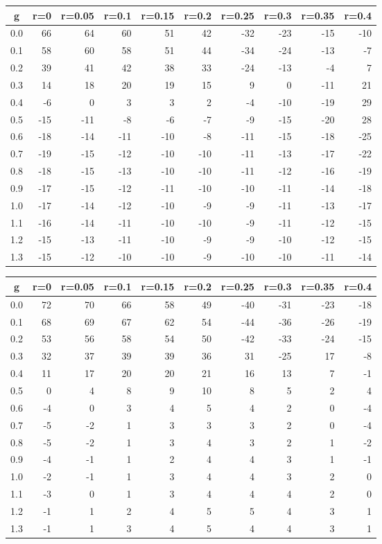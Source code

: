 %
\begin{table}[!tbp]
 \begin{center}
 \begin{tabular}{rrrrrrrrrr}\hline\hline
\multicolumn{1}{c}{g}&\multicolumn{1}{c}{r=0}&\multicolumn{1}{c}{r=0.05}&\multicolumn{1}{c}{r=0.1}&\multicolumn{1}{c}{r=0.15}&\multicolumn{1}{c}{r=0.2}&\multicolumn{1}{c}{r=0.25}&\multicolumn{1}{c}{r=0.3}&\multicolumn{1}{c}{r=0.35}&\multicolumn{1}{c}{r=0.4}\tabularnewline
\hline
0.0& 66& 64& 60& 51& 42&-32&-23&-15&-10\tabularnewline
0.1& 58& 60& 58& 51& 44&-34&-24&-13& -7\tabularnewline
0.2& 39& 41& 42& 38& 33&-24&-13& -4&  7\tabularnewline
0.3& 14& 18& 20& 19& 15&  9&  0&-11& 21\tabularnewline
0.4& -6&  0&  3&  3&  2& -4&-10&-19& 29\tabularnewline
0.5&-15&-11& -8& -6& -7& -9&-15&-20& 28\tabularnewline
0.6&-18&-14&-11&-10& -8&-11&-15&-18&-25\tabularnewline
0.7&-19&-15&-12&-10&-10&-11&-13&-17&-22\tabularnewline
0.8&-18&-15&-13&-10&-10&-11&-12&-16&-19\tabularnewline
0.9&-17&-15&-12&-11&-10&-10&-11&-14&-18\tabularnewline
1.0&-17&-14&-12&-10& -9& -9&-11&-13&-17\tabularnewline
1.1&-16&-14&-11&-10&-10& -9&-11&-12&-15\tabularnewline
1.2&-15&-13&-11&-10& -9& -9&-10&-12&-15\tabularnewline
1.3&-15&-12&-10&-10& -9&-10&-10&-11&-14\tabularnewline
\hline
\end{tabular}

\end{center}

\end{table}

%
\begin{table}[!tbp]
 \begin{center}
 \begin{tabular}{rrrrrrrrrr}\hline\hline
\multicolumn{1}{c}{g}&\multicolumn{1}{c}{r=0}&\multicolumn{1}{c}{r=0.05}&\multicolumn{1}{c}{r=0.1}&\multicolumn{1}{c}{r=0.15}&\multicolumn{1}{c}{r=0.2}&\multicolumn{1}{c}{r=0.25}&\multicolumn{1}{c}{r=0.3}&\multicolumn{1}{c}{r=0.35}&\multicolumn{1}{c}{r=0.4}\tabularnewline
\hline
0.0&72&70&66&58&49&-40&-31&-23&-18\tabularnewline
0.1&68&69&67&62&54&-44&-36&-26&-19\tabularnewline
0.2&53&56&58&54&50&-42&-33&-24&-15\tabularnewline
0.3&32&37&39&39&36& 31&-25& 17& -8\tabularnewline
0.4&11&17&20&20&21& 16& 13&  7& -1\tabularnewline
0.5& 0& 4& 8& 9&10&  8&  5&  2&  4\tabularnewline
0.6&-4& 0& 3& 4& 5&  4&  2&  0& -4\tabularnewline
0.7&-5&-2& 1& 3& 3&  3&  2&  0& -4\tabularnewline
0.8&-5&-2& 1& 3& 4&  3&  2&  1& -2\tabularnewline
0.9&-4&-1& 1& 2& 4&  4&  3&  1& -1\tabularnewline
1.0&-2&-1& 1& 3& 4&  4&  3&  2&  0\tabularnewline
1.1&-3& 0& 1& 3& 4&  4&  4&  2&  0\tabularnewline
1.2&-1& 1& 2& 4& 5&  5&  4&  3&  1\tabularnewline
1.3&-1& 1& 3& 4& 5&  4&  4&  3&  1\tabularnewline
\hline
\end{tabular}

\end{center}

\end{table}

